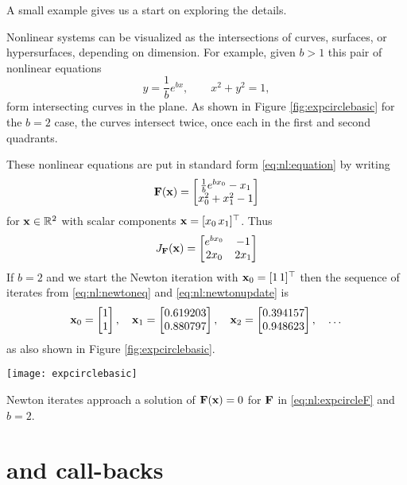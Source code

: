 A small example gives us a start on exploring the details.

\medskip\noindent\hrulefill
\begin{example}  Nonlinear systems can be visualized as the intersections of curves, surfaces, or hypersurfaces, depending on dimension.  For example, given $b > 1$ this pair of nonlinear equations
    $$y = \frac{1}{b} e^{bx}, \qquad x^2+y^2 = 1,$$
form intersecting curves in the plane.  As shown in Figure \ref{fig:expcirclebasic} for the $b=2$ case, the curves intersect twice, once each in the first and second quadrants.

These nonlinear equations are put in standard form \eqref{eq:nl:equation} by writing
\begin{equation}
\label{eq:nl:expcircleF}
\mathbf{F}(\mathbf{x}) = \begin{bmatrix}
           \frac{1}{b} e^{b x_0} - x_1 \\
           x_0^2 + x_1^2 - 1
           \end{bmatrix}
\end{equation}
for $\mathbf{x}\in \mathbb{R}^2$ with scalar components $\mathbf{x} = [x_0 \, x_1]^\top$.  Thus
\begin{equation}
J_{\mathbf{F}}(\mathbf{x}) = \begin{bmatrix}
    e^{b x_0} & -1 \\
    2 x_0   & 2 x_1 \end{bmatrix}
\end{equation}
If $b=2$ and we start the Newton iteration with $\mathbf{x}_0 = [1 \, 1]^\top$ then the sequence of iterates from \eqref{eq:nl:newtoneq} and \eqref{eq:nl:newtonupdate} is
    $${\mathbf{x}}_{0} = \begin{bmatrix} 1 \\ 1 \end{bmatrix}, \quad {\mathbf{x}}_{1} = \begin{bmatrix} 0.619203 \\ 0.880797 \end{bmatrix}, \quad {\mathbf{x}}_{2} = \begin{bmatrix} 0.394157 \\ 0.948623 \end{bmatrix}, \quad \dots$$
as also shown in Figure \ref{fig:expcirclebasic}.

\noindent\hrulefill
\end{example}

\begin{marginfigure}
\texttt{[image: expcirclebasic]}
\caption{Newton iterates approach a solution of $\mathbf{F}(\mathbf{x})=0$ for $\mathbf{F}$ in \eqref{eq:nl:expcircleF} and $b=2$.}
\label{fig:expcirclebasic}
\end{marginfigure}


\section{\pSNES and call-backs}

